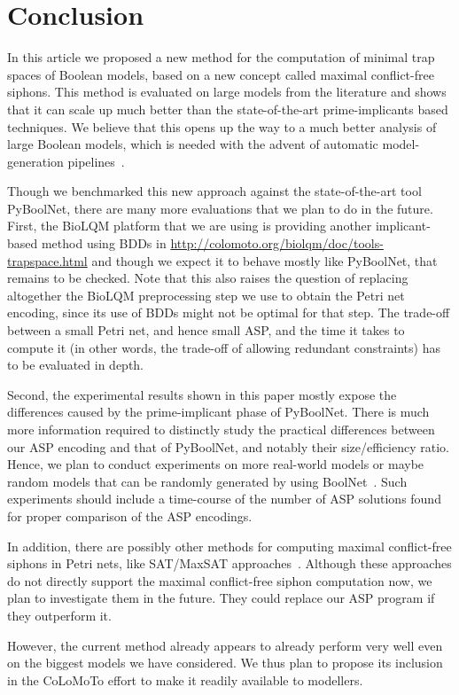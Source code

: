 \documentclass[runningheads]{llncs}
\begin{document}
\section{Conclusion}

In this article we proposed a new method for the computation of minimal trap spaces of Boolean models, based on a new concept called maximal conflict-free siphons.
This method is evaluated on large models from the literature and shows that it can scale up much better than the state-of-the-art prime-implicants based techniques.
We believe that this opens up the way to a much better analysis of large Boolean models, which is needed with the advent of automatic model-generation pipelines~\cite{ostaszewski2021covid19}.

Though we benchmarked this new approach against the state-of-the-art tool PyBoolNet, there are many more evaluations that we plan to do in the future.
First, the BioLQM platform that we are using is providing another implicant-based method using BDDs in \url{http://colomoto.org/biolqm/doc/tools-trapspace.html} and though we expect it to behave mostly like PyBoolNet, that remains to be checked.
Note that this also raises the question of replacing altogether the BioLQM preprocessing step we use to obtain the Petri net encoding, since its use of BDDs might not be optimal for that step.
The trade-off between a small Petri net, and hence small ASP, and the time it takes to compute it (in other words, the trade-off of allowing redundant constraints) has to be evaluated in depth.

Second, the experimental results shown in this paper mostly expose the differences caused by the prime-implicant phase of PyBoolNet. There is much more information required to distinctly study the practical differences between our ASP encoding and that of PyBoolNet, and notably their size/efficiency ratio.
Hence, we plan to conduct experiments on more real-world models or maybe random models that can be randomly generated by using BoolNet~\cite{mussel2010boolnet}.
Such experiments should include a time-course of the number of ASP solutions found for proper comparison of the ASP encodings.

In addition, there are possibly other methods for computing maximal conflict-free siphons in Petri nets, like SAT/MaxSAT approaches~\cite{nabli2016enumerating}. Although these approaches do not directly support the maximal conflict-free siphon computation now, we plan to investigate them in the future. They could replace our ASP program if they outperform it.

However, the current method already appears to already perform very well even on the biggest models we have considered.
We thus plan to propose its inclusion in the CoLoMoTo effort to make it readily available to modellers.




\end{document}
